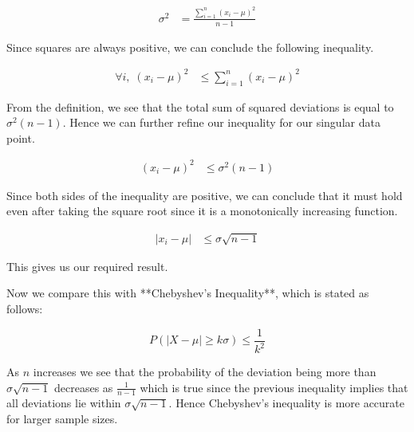 \begin{align*}
	\sigma^2 & = \frac{\sum_{i=1}^{n}(x_i - \mu)^2}{n - 1}
\end{align*}

Since squares are always positive, we can conclude the following inequality.

\begin{align*}
	\forall i,\; (x_i - \mu)^2 & \leq \sum_{i=1}^{n}(x_i - \mu)^2
\end{align*}

From the definition, we see that the total sum of squared deviations is equal to \( \sigma^2(n - 1) \). Hence we can further refine our inequality for our singular data point.

\begin{align*}
	(x_i - \mu)^2 & \leq \sigma^2(n - 1)
\end{align*}

Since both sides of the inequality are positive, we can conclude that it must hold even after taking the square root since it is a monotonically increasing function.

\begin{align*}
	|x_i - \mu| & \leq \sigma\sqrt{n - 1}
\end{align*}

This gives us our required result.

Now we compare this with **Chebyshev's Inequality**, which is stated as follows:

\[
	P(|X - \mu| \geq k\sigma) \leq \frac{1}{k^2}
\]

As $n$ increases we see that the probability of the deviation being more than $\sigma\sqrt{n - 1}$ decreases as $\frac{1}{n - 1}$ which is true since the previous inequality implies that all deviations lie within $\sigma\sqrt{n - 1}$. Hence Chebyshev's inequality is more accurate for larger sample sizes.
